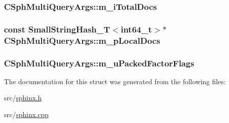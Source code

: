 \hypertarget{structCSphMultiQueryArgs_a7676a06ece9fd80fd82e010200b0754d}{
\subsubsection[{m\-\_\-i\-Total\-Docs}]{ C\-Sph\-Multi\-Query\-Args\-::m\-\_\-i\-Total\-Docs}}\label{structCSphMultiQueryArgs_a7676a06ece9fd80fd82e010200b0754d}
\hypertarget{structCSphMultiQueryArgs_a375454985544a437005ac8a7b93fd8a8}{
\subsubsection[{m\-\_\-p\-Local\-Docs}]{\setlength{\rightskip}{0pt plus 5cm}const {\bf Small\-String\-Hash\-\_\-\-T}$<${\bf int64\-\_\-t}$>$$\ast$ C\-Sph\-Multi\-Query\-Args\-::m\-\_\-p\-Local\-Docs}}\label{structCSphMultiQueryArgs_a375454985544a437005ac8a7b93fd8a8}
\hypertarget{structCSphMultiQueryArgs_a47a2c8d1b84e8a85172db02e833c43c1}{
\subsubsection[{m\-\_\-u\-Packed\-Factor\-Flags}]{ C\-Sph\-Multi\-Query\-Args\-::m\-\_\-u\-Packed\-Factor\-Flags}}\label{structCSphMultiQueryArgs_a47a2c8d1b84e8a85172db02e833c43c1}


The documentation for this struct was generated from the following files\-:\begin{DoxyCompactItemize}
\item 
src/\hyperlink{sphinx_8h}{sphinx.\-h}\item 
src/\hyperlink{sphinx_8cpp}{sphinx.\-cpp}\end{DoxyCompactItemize}

